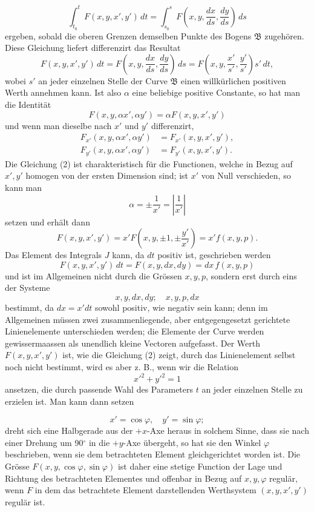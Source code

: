 \documentclass[11pt,a4paper,leqno]{article}
\begin{document}
\[
 \int_{t_0}^{t}F(x,y,x',y')\,dt
 =\int_{s_0}^{s}F\left(x,y,\frac{dx}{ds},\frac{dy}{ds}\right)\,ds
\]
ergeben, sobald die oberen Grenzen demselben Punkte des Bogens $\mathfrak{B}$ zugehören. Diese Gleichung liefert differenzirt das Resultat
\[
 F(x,y,x',y')\,dt
 =F\left(x,y,\frac{dx}{ds},\frac{dy}{ds}\right)\,ds
 =F\left(x,y,\frac{x'}{s'},\frac{y'}{s'}\right)s'\,dt,
\]
wobei $s'$ an jeder einzelnen Stelle der Curve $\mathfrak{B}$ einen willkürlichen positiven Werth annehmen kann. Ist also $\alpha$ eine beliebige positive Constante, so hat man die Identität
\begin{equation}\tag{2}
 F(x,y,\alpha x',\alpha y')=\alpha F(x,y,x',y')
\end{equation}
und wenn man dieselbe nach $x'$ und $y'$ differenzirt,
\begin{equation}\tag{3}
\begin{aligned}
 F_{x'}(x,y,\alpha x',\alpha y')&=F_{x'}(x,y,x',y'),\\
 F_{y'}(x,y,\alpha x',\alpha y')&=F_{y'}(x,y,x',y').
\end{aligned}
\end{equation}
Die Gleichung (2) ist charakteristisch für die Functionen, welche in Bezug auf $x',y'$ homogen von der ersten Dimension sind; ist $x'$ von Null verschieden, so kann man
\[
 \alpha=\pm\frac{1}{x'}=\left|\frac{1}{x'}\right|
\]
setzen und erhält dann
\[
 F(x,y,x',y')=x'F\left(x,y,\pm1,\pm\frac{y'}{x'}\right)=x'f(x,y,p).
\]
Das Element des Integrals $J$ kann, da $dt$ positiv ist, geschrieben werden
\[
 F(x,y,x',y')\,dt=F(x,y,dx,dy)=dx\,f(x,y,p)
\]
und ist im Allgemeinen nicht durch die Grössen $x,y,p$, sondern erst durch eins der Systeme
\[
 x,y,dx,dy;\quad x,y,p,dx
\]
bestimmt, da $dx=x'dt$ sowohl positiv, wie negativ sein kann; denn im Allgemeinen müssen zwei zusammenliegende, aber entgegengesetzt gerichtete Linienelemente unterschieden werden; die Elemente der Curve werden gewissermaassen als unendlich kleine Vectoren aufgefasst. Der Werth $F(x,y,x',y')$ ist, wie die Gleichung (2) zeigt, durch das Linienelement selbst noch nicht bestimmt, wird es aber z. B., wenn wir die Relation
\[
 x'^2+y'^2=1
\]
ansetzen, die durch passende Wahl des Parameters $t$ an jeder einzelnen Stelle zu erzielen ist. Man kann dann setzen

\[
 x'=\cos\varphi,\quad y'=\sin\varphi;
\]
dreht sich eine Halbgerade aus der $+x$-Axe heraus in solchem Sinne, dass sie nach einer Drehung um 90$^\circ$ in die $+y$-Axe übergeht, so hat sie den Winkel $\varphi$ beschrieben, wenn sie dem betrachteten Element gleichgerichtet worden ist. Die Grösse $F(x,y,\cos\varphi,\sin\varphi)$ ist daher eine stetige Function der Lage und Richtung des betrachteten Elementes und offenbar in Bezug auf $x,y,\varphi$ regulär, wenn $F$ in dem das betrachtete Element darstellenden Werthsystem $(x,y,x',y')$ regulär ist.
\end{document}
